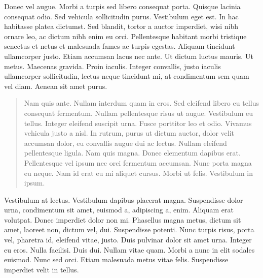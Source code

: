 \documentclass[cfonts]{nostarch}
\begin{document}
Donec vel augue. Morbi a turpis sed libero consequat porta. Quisque
lacinia consequat odio. Sed vehicula sollicitudin purus. Vestibulum
eget est. In hac habitasse platea dictumst. Sed blandit, tortor a
auctor imperdiet, wisi nibh ornare leo, ac dictum nibh enim eu orci.
Pellentesque habitant morbi tristique senectus et netus et malesuada
fames ac turpis egestas.  Aliquam tincidunt ullamcorper justo. Etiam
accumsan lacus nec ante.  Ut dictum luctus mauris. Ut metus. Maecenas
gravida. Proin iaculis.  Integer convallis, justo iaculis ullamcorper
sollicitudin, lectus neque tincidunt mi, at condimentum sem quam vel
diam. Aenean sit amet purus.
\begin{quote}
  Nam quis ante. Nullam interdum quam in eros.  Sed eleifend libero eu
  tellus consequat fermentum. Nullam pellentesque risus ut augue.
  Vestibulum eu tellus. Integer eleifend suscipit urna. Fusce
  porttitor leo et odio. Vivamus vehicula justo a nisl. In rutrum,
  purus ut dictum auctor, dolor velit accumsan dolor, eu convallis
  augue dui ac lectus. Nullam eleifend pellentesque ligula. Nam quis
  magna. Donec elementum dapibus erat. Pellentesque vel ipsum nec orci
  fermentum accumsan. Nunc porta magna eu neque.  Nam id erat eu mi
  aliquet cursus. Morbi ut felis. Vestibulum in ipsum.
\end{quote}

Vestibulum at lectus. Vestibulum dapibus placerat magna. Suspendisse
dolor urna, condimentum sit amet, euismod a, adipiscing a, enim.
Aliquam erat volutpat. Donec imperdiet dolor non mi. Phasellus magna
metus, dictum sit amet, laoreet non, dictum vel, dui. Suspendisse
potenti. Nunc turpis risus, porta vel, pharetra id, eleifend vitae,
justo. Duis pulvinar dolor sit amet urna. Integer eu eros. Nulla
facilisi. Duis dui.  Nullam vitae quam. Morbi a nunc in elit sodales
euismod. Nunc sed orci. Etiam malesuada metus vitae felis. Suspendisse
imperdiet velit in tellus.
\begin{quotation}
\lipsum[40-42]  
\end{quotation}

\lipsum[43-50]
\end{document}
